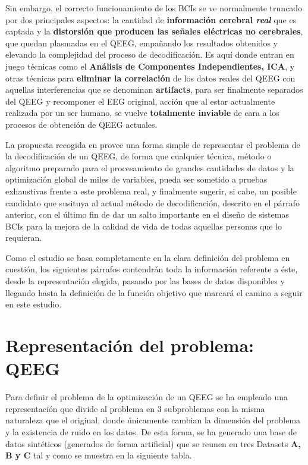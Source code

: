 Sin embargo, el correcto funcionamiento de los BCIs se ve normalmente truncado por dos principales aspectos: la cantidad de \textbf{información cerebral \textit{real}} que es captada y la \textbf{distorsión que producen las señales eléctricas no cerebrales}, que quedan plasmadas en el QEEG, empañando los resultados obtenidos y elevando la complejidad del proceso de decodificación. Es aquí donde entran en juego técnicas como el \textbf{Análisis de Componentes Independientes, ICA}, y otras técnicas para \textbf{eliminar la correlación} de los datos reales del QEEG con aquellas interferencias que se denominan \textbf{artifacts}, para ser finalmente separados del QEEG y recomponer el EEG original, acción que al estar actualmente realizada por un ser humano, se vuelve \textbf{totalmente inviable} de cara a los procesos de obtención de QEEG actuales.

La propuesta recogida en\cite{EvolutionaryBigOpt} provee una forma simple de representar el problema de la decodificación de un QEEG, de forma que cualquier técnica, método o algoritmo preparado para el procesamiento de grandes cantidades de datos y la optimización global de miles de variables, pueda ser sometido a pruebas exhaustivas frente a este problema real, y finalmente sugerir, si cabe, un posible candidato que susituya al actual método de decodificación, descrito en el párrafo anterior, con el último fin de dar un salto importante en el diseño de sistemas BCIs para la mejora de la calidad de vida de todas aquellas personas que lo requieran.

Como el estudio se basa completamente en la clara definición del problema en cuestión, los siguientes párrafos contendrán toda la información referente a éste, desde la representación elegida, pasando por las bases de datos disponibles y llegando hasta la definición de la función objetivo que marcará el camino a seguir en este estudio.

\section{Representación del problema: QEEG}

Para definir el problema de la optimización de un QEEG se ha empleado una representación que divide al problema en 3 subproblemas con la misma naturaleza que el original, donde únicamente cambian la dimensión del problema y la existencia de ruido en los datos. De esta forma, se ha generado una base de datos sintéticos (generados de forma artificial) que se reunen en tres Datasets \textbf{A, B y C} tal y como se muestra en la siguiente tabla.

